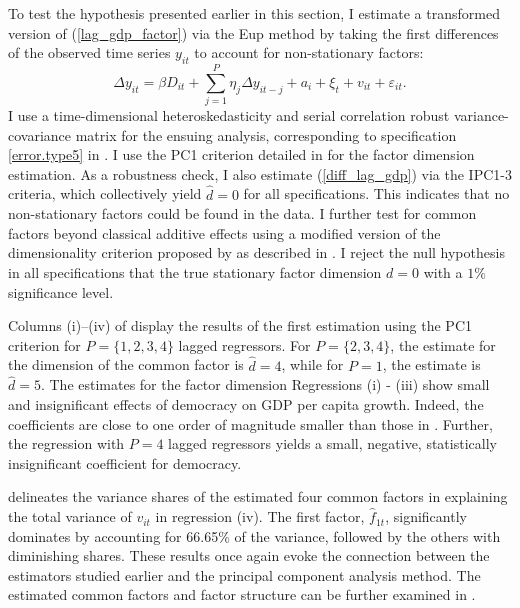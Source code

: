 To test the hypothesis presented earlier in this section, I estimate a transformed version of (\ref{lag_gdp_factor}) via the Eup method by taking the first differences of the observed time series $y_{it}$ to account for non-stationary factors:
\begin{equation}\label{diff_lag_gdp}
\Delta y_{it} = \beta D_{it} + \sum_{j=1}^P \eta_j \Delta y_{it-j} + a_i + \xi_t + v_{it} + \varepsilon_{it}.
\end{equation}
 I use a time-dimensional heteroskedasticity and serial correlation robust variance-covariance matrix for the ensuing analysis, corresponding to specification  \ref{error.type5} in . I use the PC1 criterion detailed in \citet{bai2002determining} for the factor dimension estimation. As a robustness check, I also estimate (\ref{diff_lag_gdp}) via the IPC1-3 criteria, which collectively yield $\hat{d} = 0$ for all specifications. This indicates that no non-stationary factors could be found in the data. I further test for common factors beyond classical additive effects using a modified version of the dimensionality criterion proposed by \citet{kneip2012new} as described in \citet{bada2012phtt}. I reject the null hypothesis in all specifications that the true stationary factor dimension $d = 0$  with a $1\%$ significance level. 


Columns (i)--(iv) of  display the results of the first estimation using the PC1 criterion for \( P = \{1,2,3,4\} \) lagged regressors. For \( P = \{2,3,4\} \), the estimate for the dimension of the common factor is \( \hat{d} = 4 \), while for \( P = 1 \), the estimate is \( \hat{d} = 5 \).
The estimates for the factor dimension Regressions (i) - (iii) show small and insignificant effects of democracy on \ac{GDP} per capita growth. Indeed, the coefficients are close to one order of magnitude smaller than those in . Further, the regression with $P = 4$ lagged regressors yields a small, negative, statistically insignificant coefficient for democracy.

 delineates the variance shares of the estimated four common factors in explaining the total variance of \( v_{it} \) in regression (iv). The first factor, \( \hat{f}_{1t} \), significantly dominates by accounting for 66.65\% of the variance, followed by the others with diminishing shares. These results once again evoke the connection between the estimators studied earlier and the principal component analysis method. The estimated common factors and factor structure can be further examined in .


